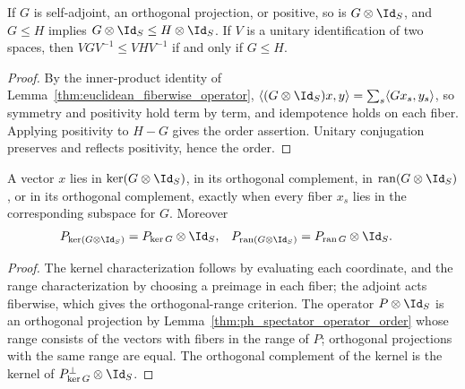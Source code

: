 \begin{lemma}
    \label{thm:ph_spectator_operator_order}
    \leanok
    If $G$ is self-adjoint, an orthogonal projection, or positive, so is
    $G\otimes\Id_S$, and $G\le H$ implies $G\otimes\Id_S\le H\otimes\Id_S$. If
    $V$ is a unitary identification of two spaces, then
    $VGV^{-1}\le VHV^{-1}$ if and only if $G\le H$.
\end{lemma}
\begin{proof}
    \leanok
    By the inner-product identity of
    Lemma~\ref{thm:euclidean_fiberwise_operator},
    $\langle(G\otimes\Id_S)x,y\rangle=\sum_s\langle Gx_s,y_s\rangle$, so
    symmetry and positivity hold term by term, and idempotence holds on each
    fiber. Applying positivity to $H-G$ gives the order assertion. Unitary
    conjugation preserves and reflects positivity, hence the order.
\end{proof}

\begin{lemma}
    \label{lem:right-spectator-kernel-projection}
    \leanok
    A vector $x$ lies in $\ker(G\otimes\Id_S)$, in its orthogonal complement,
    in $\operatorname{ran}(G\otimes\Id_S)$, or in its orthogonal complement,
    exactly when every fiber $x_s$ lies in the corresponding subspace for $G$.
    Moreover
    \begin{align}
        P_{\ker(G\otimes\Id_S)}               & =P_{\ker G}\otimes\Id_S,              &
        P_{\operatorname{ran}(G\otimes\Id_S)} & =P_{\operatorname{ran}G}\otimes\Id_S.
        \notag
    \end{align}
\end{lemma}
\begin{proof}
    \leanok
    The kernel characterization follows by evaluating each coordinate, and
    the range characterization by choosing a preimage in each fiber; the
    adjoint acts fiberwise, which gives the orthogonal-range criterion. The
    operator $P\otimes\Id_S$ is an orthogonal projection by
    Lemma~\ref{thm:ph_spectator_operator_order} whose range consists of the
    vectors with fibers in the range of $P$; orthogonal projections with the
    same range are equal. The orthogonal complement of the kernel is the
    kernel of $P_{\ker G}^\perp\otimes\Id_S$.
\end{proof}

